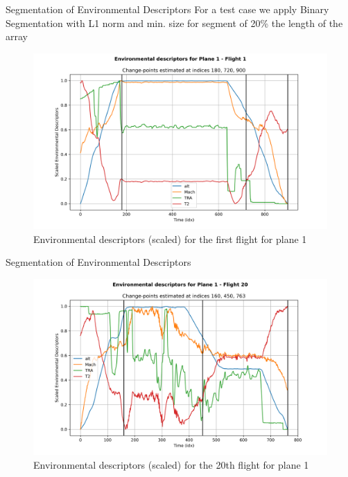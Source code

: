 \documentclass{beamer}
\begin{document}
        \begin{frame}{Segmentation of Environmental Descriptors}
            For a test case we apply Binary Segmentation with L1 norm and min. size for segment of 20\% the length of the array
            \begin{figure}
                \centering
                \includegraphics[scale=0.35]{environment_split_1_1.png}
                \caption{Environmental descriptors (scaled) for the first flight for plane 1}
            \end{figure}
        \end{frame}

        \begin{frame}{Segmentation of Environmental Descriptors}
            \begin{figure}
                \centering
                \includegraphics[scale=0.35]{environment_split_1_20.png}
                \caption{Environmental descriptors (scaled) for the 20th flight for plane 1}
            \end{figure}
        \end{frame}
\end{document}
